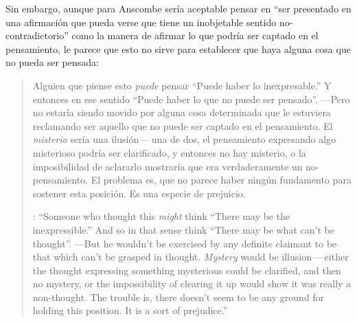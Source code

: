 Sin embargo, aunque para Anscombe sería aceptable pensar en ``ser presentado en una afirmación que pueda verse que tiene un inobjetable sentido no-contradictorio'' como la manera de afirmar lo que podría ser captado en el pensamiento, le parece que esto no sirve para establecer que haya alguna cosa que no pueda ser pensada: \blockquote[{\cite[8]{anscombe1981parmenides:pmc}}: \enquote{Someone who thought this \emph{might} think ``There may be the inexpressible.'' And so in that sense think ``There may be what can't be thought''. ---But he wouldn't be exercised by any definite claimant to be that which can't be grasped in thought. \emph{Mystery} would be illusion\,---\,either the thought expressing something mysterious could be clarified, and then no mystery, or the impossibility of clearing it up would show it was really a non-thought. The trouble is, there doesn't seem to be any ground for holding this position. It is a sort of prejudice.}]{Alguien que piense esto \emph{puede} pensar ``Puede haber lo inexpresable.'' Y entonces en ese sentido ``Puede haber lo que no puede ser pensado''. ---Pero no estaría siendo movido por alguna cosa determinada que le estuviera reclamando ser aquello que no puede ser captado en el pensamiento. El \emph{misterio} sería una ilusión\,---\,una de dos, el pensamiento expresando algo misterioso podría ser clarificado, y entonces no hay misterio, o la imposibilidad de aclararlo mostraría que era verdaderamente un no-pensamiento. El problema es, que no parece haber ningún fundamento para sostener esta posición. Es una especie de prejuicio.}

